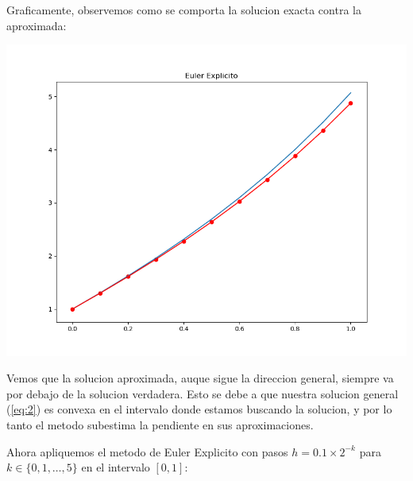 \documentclass[11pt]{article}
\makeatletter
\def\maxwidth{\ifdim\Gin@nat@width>\linewidth\linewidth
    \else\Gin@nat@width\fi}
\let\Oldincludegraphics\includegraphics
\renewcommand{\includegraphics}[1]{\Oldincludegraphics[width=.8\maxwidth]{#1}}
\makeatother
\begin{document}
    Graficamente, observemos como se comporta la solucion exacta contra la
aproximada:
    \begin{center}
    \includegraphics{fig 1.1.png}
    \end{center}
    
    Vemos que la solucion aproximada, auque sigue la direccion general,
siempre va por debajo de la solucion verdadera. Esto se debe a que
nuestra solucion general (\ref{eq:2}) es convexa en el intervalo donde
estamos buscando la solucion, y por lo tanto el metodo subestima la
pendiente en sus aproximaciones.

Ahora apliquemos el metodo de Euler Explicito con pasos
\(h = 0.1 \times 2^{-k}\) para \(k \in \{0,1,\dots, 5\}\) en el
intervalo \([0,1]\):
\end{document}
